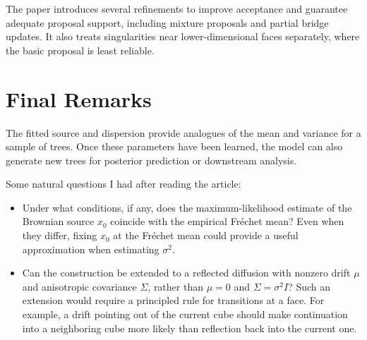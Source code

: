 The paper introduces several refinements to improve acceptance and guarantee
adequate proposal support, including mixture proposals and partial bridge
updates. It also treats singularities near lower-dimensional faces separately,
where the basic proposal is least reliable.

\section{Final Remarks}

The fitted source and dispersion provide analogues of the mean and variance for
a sample of trees. Once these parameters have been learned, the model can also
generate new trees for posterior prediction or downstream analysis.

Some natural questions I had after reading the article:

\begin{itemize}
    \item Under what conditions, if any, does the maximum-likelihood estimate
    of the Brownian source $x_0$ coincide with the empirical Fr\'echet mean?
    Even when they differ, fixing $x_0$ at the Fr\'echet mean could provide a
    useful approximation when estimating $\sigma^2$.

    \item Can the construction be extended to a reflected diffusion with
    nonzero drift $\mu$ and anisotropic covariance $\Sigma$, rather than
    $\mu=0$ and $\Sigma=\sigma^2I$? Such an extension would require a principled
    rule for transitions at a face. For example, a drift pointing out of the
    current cube should make continuation into a neighboring cube more likely
    than reflection back into the current one.

\end{itemize}





\newpage




